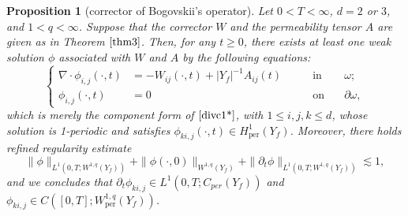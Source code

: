 \documentclass[13pt,CJK]{article}
\theoremstyle{plain}                       %
\newtheorem{proposition}[lemma]{Proposition}
\theoremstyle{remark}
\numberwithin{equation}{section}
\begin{document}
\begin{proposition}[corrector of Bogovskii's operator]\label{prop3.1}
Let $0<T<\infty$, $d=2$ or $3$, and $1<q<\infty$.
Suppose that the corrector $W$ and the permeability tensor $A$ are given as in Theorem $\ref{thm3}$.
Then, for any $t\geq 0$, there exists at least one weak solution $\phi$ associated with $W$ and $A$ by the following equations:
\begin{equation}\label{divc1}
\left\{
\begin{aligned}
\nabla\cdot\phi_{i,j}(\cdot,t) &=-W_{ij}(\cdot,t)
+|Y_f|^{-1} A_{ij}(t)&\qquad\text{in}&\quad\omega;\\
\phi_{i,j}(\cdot,t)&=0&\qquad\text{on}&\quad\partial\omega,
\end{aligned}
\right.
\end{equation}
which is merely the component form of $\eqref{divc1*}$,
with $1\leq i,j,k\leq d$, whose solution is
1-periodic and satisfies $\phi_{ki,j} (\cdot,t)\in H^1_{\text{per}}(Y_f)$.
Moreover, there holds refined regularity estimate
\begin{equation}\label{pri:4.2}
\|\phi\|_{L^1(0,T;W^{1,q}(Y_f))}
+\|\phi(\cdot,0)\|_{W^{1,q}(Y_f)}
+\|\partial_t\phi\|_{L^1(0,T;W^{1,q}(Y_f))}\lesssim 1,
\end{equation}
and we concludes that $\partial_t\phi_{ki,j}\in L^1(0,T;C_{per}(Y_f))$
and $\phi_{ki,j}\in C([0,T];W_{\text{per}}^{1,q}(Y_f))$.
\end{proposition}
\end{document}
